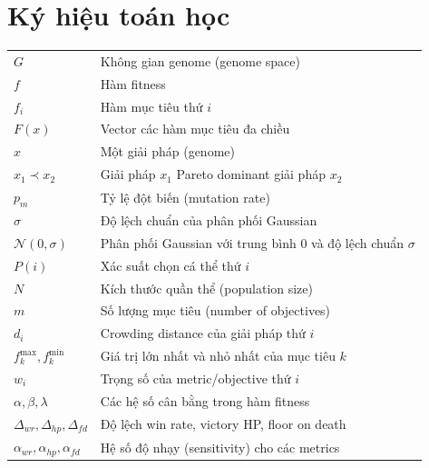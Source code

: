 \section*{Ký hiệu toán học}
\begin{tabularx}{\textwidth}{l X}
    $G$ & Không gian genome (genome space) \\
    $f$ & Hàm fitness \\
    $f_i$ & Hàm mục tiêu thứ $i$ \\
    $F(x)$ & Vector các hàm mục tiêu đa chiều \\
    $x$ & Một giải pháp (genome) \\
    $x_1 \prec x_2$ & Giải pháp $x_1$ Pareto dominant giải pháp $x_2$ \\
    $p_m$ & Tỷ lệ đột biến (mutation rate) \\
    $\sigma$ & Độ lệch chuẩn của phân phối Gaussian \\
    $\mathcal{N}(0, \sigma)$ & Phân phối Gaussian với trung bình 0 và độ lệch chuẩn $\sigma$ \\
    $P(i)$ & Xác suất chọn cá thể thứ $i$ \\
    $N$ & Kích thước quần thể (population size) \\
    $m$ & Số lượng mục tiêu (number of objectives) \\
    $d_i$ & Crowding distance của giải pháp thứ $i$ \\
    $f_k^{\max}, f_k^{\min}$ & Giá trị lớn nhất và nhỏ nhất của mục tiêu $k$ \\
    $w_i$ & Trọng số của metric/objective thứ $i$ \\
    $\alpha, \beta, \lambda$ & Các hệ số cân bằng trong hàm fitness \\
    $\Delta_{wr}, \Delta_{hp}, \Delta_{fd}$ & Độ lệch win rate, victory HP, floor on death \\
    $\alpha_{wr}, \alpha_{hp}, \alpha_{fd}$ & Hệ số độ nhạy (sensitivity) cho các metrics \\
\end{tabularx}

\clearpage
\vspace{1cm}


